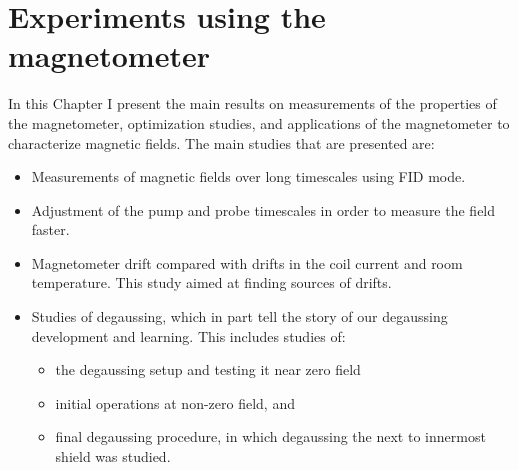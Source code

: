\chapter{Experiments using the magnetometer\label{ch:results}}

In this Chapter I present the main results on measurements of the
properties of the magnetometer, optimization studies, and applications
of the magnetometer to characterize magnetic fields.  The main studies
that are presented are:
\begin{itemize}
\item Measurements of magnetic fields over long timescales using FID mode.
\item Adjustment of the pump and probe timescales in order to measure
  the field faster.
\item Magnetometer drift compared with drifts in the coil current and
  room temperature.  This study aimed at finding sources of drifts.
\item Studies of degaussing, which in part tell the story of our
  degaussing development and learning.  This includes studies of:
  \begin{itemize}
    \item the degaussing setup and testing it near zero field
    \item initial operations at non-zero field, and
    \item final degaussing procedure, in which degaussing the next to
      innermost shield was studied.
  \end{itemize}

\end{itemize}
